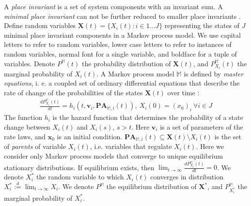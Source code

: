 \documentclass{article}
\begin{document}
A {\it place invariant} is a set of system components with an invariant sum. A {\it minimal place invariant} can not be further reduced to smaller place invariants \cite{dubins1966invariant}. Define random variables $\mathbf{X}(t) = \{X_i(t): i \in 1 ... J\}$ representing the states of $J$ minimal place invariant components in a Markov process model.  We use capital letters to refer to random variables, lower case letters to refer to instances of random variables, normal font for a single variable, and boldface for a tuple of variables. Denote $P^{\mathbb{M}}(t)$ the probability distribution of $\mathbf{X}(t)$, and $P^{\mathbb{M}}_{X_i}(t)$ the marginal probability of $X_i(t)$. A Markov process model $\mathbb{M}$ is defined by \emph{master equations}, i. e. a coupled set of ordinary differential equations that describe the rate of change of the probabilities of the states $\mathbf{X}(t)$ over time \cite{wilkinson2009stochastic}:
\vspace{-2mm}
\begin{eqnarray}
\frac{dP^{\mathbb{M}}_{X_i}(t)}{dt} = h_i\left(t, \textbf{v}_i, \mathbf{PA}_{\mathbb{M}, i}(t)\right), \  X_i(0) = (x_0)_i \ \forall i \in J
\end{eqnarray}
The function $h_i$ is the hazard function that determines the probability of a state change between $X_i(t)$ and $X_i(s)$, $s>t$. Here $\mathbf{v}_i$ is a set of parameters of the rate laws, and $\mathbf{x}_0$ is an initial condition. $\mathbf{PA}_{\mathbb{M}, i}(t) \subseteq \mathbf{X}(t) \setminus X_i(t)$ is the set of \emph{parents} of variable $X_i(t)$, i.e. variables that regulate $X_i(t)$. Here we consider only Markov process models that converge to unique equilibrium stationary distributions.  If equilibrium exists, then $\lim_{t\to \infty}\frac{dP^{\mathbb{M}}_{X_i}(t)}{dt}=0 $. We denote $X_i^*$ the random variable to which $X_i(t)$ converges in distribution $X_i^* \overset{d}{:=}  \lim_{t\to \infty} X_i$.
We denote $P^{\mathbb{M}}$ the equilibrium distribution of $\mathbf{X}^*$, and $P^{\mathbb{M}}_{X_i^*}$ the marginal probability of $X_i^*$.
\end{document}
